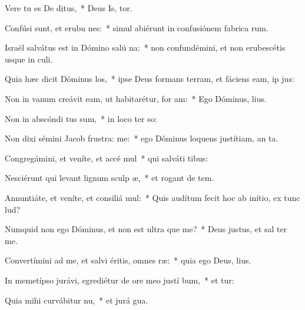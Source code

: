 \item Vere tu es De ditus,~* Deus Is, tor.
\item Confúsi sunt, et erubu nes:~* simul abiérunt in confusiónem fabrica rum.
\item Israël salvátus est in Dómino salú na:~* non confundémini, et non erubescétis usque in  culi.
\item Quia hæc dicit Dóminus  los,~* ipse Deus formans terram, et fáciens eam, ip  jus:
\item Non in vanum creávit eam, ut habitarétur, for am:~* Ego Dóminus,    lius.
\item Non in abscóndi tus sum,~* in loco ter so:
\item Non dixi sémini Jacob frustra:  me:~* ego Dóminus loquens justítiam, an ta.
\item Congregámini, et veníte, et accé mul~* qui salváti   tibus:
\item Nesciérunt qui levant lignum sculp æ,~* et rogant de  tem.
\item Annuntiáte, et veníte, et consiliá mul:~* Quis audítum fecit hoc ab inítio, ex tunc  lud?
\item Numquid non ego Dóminus, et non est ultra  que me?~* Deus justus, et sal   ter me.
\item Convertímini ad me, et salvi éritis, omnes  ræ:~* quia ego Deus,    lius.
\item In memetípso jurávi, egrediétur de ore meo justí bum,~* et  tur:
\item Quia mihi curvábitur  nu,~* et jurá  gua.
